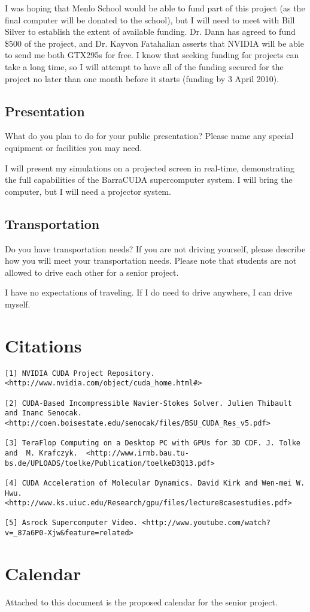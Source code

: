 \documentclass[10pt]{article}
\begin{document}
I was hoping that Menlo School would be able to fund part of this project (as the final computer will be donated to the school), but I will need to meet with Bill Silver to establish the extent of available funding. Dr. Dann has agreed to fund \$500 of the project, and Dr. Kayvon Fatahalian asserts that NVIDIA will be able to send me both GTX295s for free. I know that seeking funding for projects can take a long time, so I will attempt to have all of the funding secured for the project no later than one month before it starts (funding by 3 April 2010).

\subsection{Presentation}
What do you plan to do for your public presentation? Please name any special equipment or facilities you may need.

I will present my simulations on a projected screen in real-time, demonstrating the full capabilities of the BarraCUDA supercomputer system. I will bring the computer, but I will need a projector system.

\subsection{Transportation}
Do you have transportation needs? If you are not driving yourself, please describe how you will meet your transportation needs. Please note that students are not allowed to drive each other for a senior project.

I have no expectations of traveling. If I do need to drive anywhere, I can drive myself.

\section{Citations}
\begin{verbatim}
[1] NVIDIA CUDA Project Repository. <http://www.nvidia.com/object/cuda_home.html#>

[2] CUDA-Based Incompressible Navier-Stokes Solver. Julien Thibault and Inanc Senocak.  <http://coen.boisestate.edu/senocak/files/BSU_CUDA_Res_v5.pdf>

[3] TeraFlop Computing on a Desktop PC with GPUs for 3D CDF. J. Tolke and  M. Krafczyk.  <http://www.irmb.bau.tu-bs.de/UPLOADS/toelke/Publication/toelkeD3Q13.pdf>

[4] CUDA Acceleration of Molecular Dynamics. David Kirk and Wen-mei W. Hwu.  <http://www.ks.uiuc.edu/Research/gpu/files/lecture8casestudies.pdf>

[5] Asrock Supercomputer Video. <http://www.youtube.com/watch?v=_87a6P0-Xjw&feature=related>
\end{verbatim}

\section{Calendar}
Attached to this document is the proposed calendar for the senior project.
\end{document}
